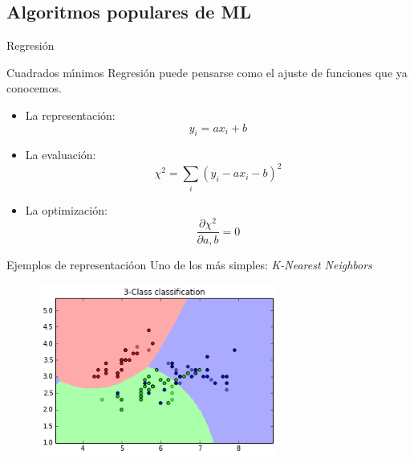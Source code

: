 \documentclass[11pt]{beamer}
\begin{document}
\subsection{Algoritmos populares de ML}
\begin{frame}{Regresi\'on}
    
    \begin{block}{Cuadrados m\'{\i}nimos}
    Regresi\'on puede pensarse como el ajuste de funciones que ya conocemos.
    \end{block}
    
    \begin{itemize}
        \item La representaci\'on: $$y_i = a x_i + b$$
        \item La evaluaci\'on: $$\chi^2 = \sum_i(y_i - a x_i -b)^2$$
        \item La optimizaci\'on: $$\frac{\partial \chi^2}{\partial a,b} = 0$$
   \end{itemize}
\end{frame}
\begin{frame}{Ejemplos de representaci\'oon}
  Uno de los m\'as simples: \textit{K-Nearest Neighbors}
  \begin{figure}
  \centering
  \includegraphics[width=0.7\textwidth]{images/knearest_example.png}
  \label{fig:my_label}
  \end{figure}
\end{frame}
\end{document}
